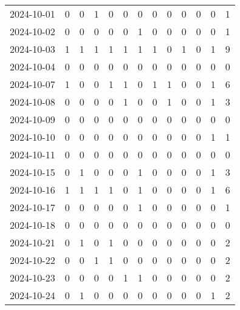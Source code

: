 \documentclass[dvipdfmx,oneside]{article}
\begin{document}
\begin{longtable}{lcccccccccccc}
        2024-10-01 &     0 &     0 &     1 &     0 &     0 &     0 &     0 &     0 &     0 &     0 &     0 &      1 \\
        2024-10-02 &     0 &     0 &     0 &     0 &     0 &     1 &     0 &     0 &     0 &     0 &     0 &      1 \\
        2024-10-03 &     1 &     1 &     1 &     1 &     1 &     1 &     1 &     0 &     1 &     0 &     1 &      9 \\
        2024-10-04 &     0 &     0 &     0 &     0 &     0 &     0 &     0 &     0 &     0 &     0 &     0 &      0 \\
        2024-10-07 &     1 &     0 &     0 &     1 &     1 &     0 &     1 &     1 &     0 &     0 &     1 &      6 \\
        2024-10-08 &     0 &     0 &     0 &     0 &     1 &     0 &     0 &     1 &     0 &     0 &     1 &      3 \\
        2024-10-09 &     0 &     0 &     0 &     0 &     0 &     0 &     0 &     0 &     0 &     0 &     0 &      0 \\
        2024-10-10 &     0 &     0 &     0 &     0 &     0 &     0 &     0 &     0 &     0 &     0 &     1 &      1 \\
        2024-10-11 &     0 &     0 &     0 &     0 &     0 &     0 &     0 &     0 &     0 &     0 &     0 &      0 \\
        2024-10-15 &     0 &     1 &     0 &     0 &     0 &     1 &     0 &     0 &     0 &     0 &     1 &      3 \\
        2024-10-16 &     1 &     1 &     1 &     1 &     0 &     1 &     0 &     0 &     0 &     0 &     1 &      6 \\
        2024-10-17 &     0 &     0 &     0 &     0 &     0 &     1 &     0 &     0 &     0 &     0 &     0 &      1 \\
        2024-10-18 &     0 &     0 &     0 &     0 &     0 &     0 &     0 &     0 &     0 &     0 &     0 &      0 \\
        2024-10-21 &     0 &     1 &     0 &     1 &     0 &     0 &     0 &     0 &     0 &     0 &     0 &      2 \\
        2024-10-22 &     0 &     0 &     1 &     1 &     0 &     0 &     0 &     0 &     0 &     0 &     0 &      2 \\
        2024-10-23 &     0 &     0 &     0 &     0 &     1 &     1 &     0 &     0 &     0 &     0 &     0 &      2 \\
        2024-10-24 &     0 &     1 &     0 &     0 &     0 &     0 &     0 &     0 &     0 &     0 &     1 &      2 \\

\end{longtable}
\end{document}
